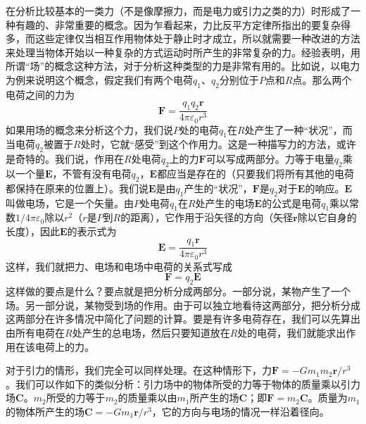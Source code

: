 在分析比较基本的一类力（不是像摩擦力，而是电力或引力之类的力）时形成了一种有趣的、非常重要的概念。因为乍看起来，力比反平方定律所指出的要复杂得多，而这些定律仅当相互作用物体处于静止时才成立，所以就需要一种改进的方法来处理当物体开始以一种复杂的方式运动时所产生的非常复杂的力。经验表明，用所谓“场”的概念这种方法，对于分析这种类型的力是非常有用的。比如说，以电力为例来说明这个概念，假定我们有两个电荷$q_1$、$q_2$分别位于$P$点和$R$点。那么两个电荷之间的力为
\begin{equation}
    \label{Eq:I:12:3}
    \boldsymbol{F}=\frac{q_1q_2 \boldsymbol{r}}{4 \pi \varepsilon_0 r^3}
\end{equation}
如果用场的概念来分析这个力，我们说$P$处的电荷$q_1$在$R$处产生了一种“状况”，而当电荷$q_2$被置于$R$处时，它就“感受”到这个作用力。这是一种描写力的方法，或许是奇特的。我们说，作用在$R$处电荷$q_2$上的力$\boldsymbol{F}$可以写成两部分。力等于电量$q_2$乘以一个量$\boldsymbol{E}$，不管有没有电荷$q_2$，$\boldsymbol{E}$都应当是存在的（只要我们将所有其他的电荷都保持在原来的位置上）。我们说$\boldsymbol{E}$是由$q_1$产生的“状况”，$\boldsymbol{F}$是$q_2$对于$\boldsymbol{E}$的响应。$\boldsymbol{E}$叫做电场，它是一个矢量。由$P$处电荷$q_1$在$R$处产生的电场$\boldsymbol{E}$的公式是电荷$q_1$乘以常数$1/4 \pi \varepsilon_0$除以$r^2$（$r$是$P$到$R$的距离），它作用于沿矢径的方向（矢径$\boldsymbol{r}$除以它自身的长度），因此$\boldsymbol{E}$的表示式为
\begin{equation}
    \label{Eq:I:12:4}
    \boldsymbol{E}=\frac{q_1 \boldsymbol{r}}{4 \pi \varepsilon_0 r^3}
\end{equation}
这样，我们就把力、电场和电场中电荷的关系式写成
\begin{equation}
    \label{Eq:I:12:5}
    \boldsymbol{F}=q_2 \boldsymbol{E}
\end{equation}
这样做的要点是什么？要点就是把分析分成两部分。一部分说，某物产生了一个场。另一部分说，某物受到场的作用。由于可以独立地看待这两部分，把分析分成这两部分在许多情况中简化了问题的计算。要是有许多电荷存在，我们可以先算出由所有电荷在$R$处产生的总电场，然后只要知道放在$R$处的电荷，我们就能求出作用在该电荷上的力。

对于引力的情形，我们完全可以同样处理。在这种情形下，力$\boldsymbol{F}=-Gm_1m_2\boldsymbol{r}/r^3$。我们可以作如下的类似分析：引力场中的物体所受的力等于物体的质量乘以引力场$\boldsymbol{C}$。$m_2$所受的力等于$m_2$的质量乘以由$m_1$所产生的场$\boldsymbol{C}$；即$\boldsymbol{F}=m_2\boldsymbol{C}$。质量为$m_1$的物体所产生的场$\boldsymbol{C}=-Gm_1 \boldsymbol{r}/r^3$，它的方向与电场的情况一样沿着径向。


